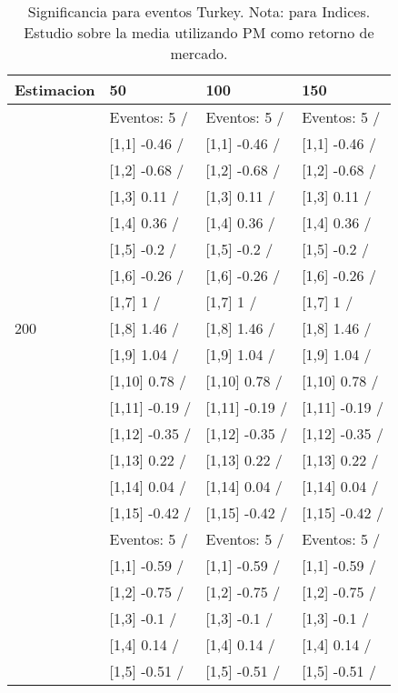 \begin{table}

\caption{Significancia para eventos Turkey. Nota: para Indices. Estudio sobre la media utilizando PM como retorno de mercado.}
\centering
\begin{tabular}[t]{llll}
\toprule
Estimacion & 50 & 100 & 150\\
\midrule
 & Eventos:  5 / & Eventos:  5 / & Eventos:  5 /\\
 & {}[1,1] -0.46  / & {}[1,1] -0.46  / & {}[1,1] -0.46  /\\
 & {}[1,2] -0.68  / & {}[1,2] -0.68  / & {}[1,2] -0.68  /\\
 & {}[1,3] 0.11  / & {}[1,3] 0.11  / & {}[1,3] 0.11  /\\
 & {}[1,4] 0.36  / & {}[1,4] 0.36  / & {}[1,4] 0.36  /\\
\addlinespace
 & {}[1,5] -0.2  / & {}[1,5] -0.2  / & {}[1,5] -0.2  /\\
 & {}[1,6] -0.26  / & {}[1,6] -0.26  / & {}[1,6] -0.26  /\\
 & {}[1,7] 1  / & {}[1,7] 1  / & {}[1,7] 1  /\\
200 & {}[1,8] 1.46  / & {}[1,8] 1.46  / & {}[1,8] 1.46  /\\
 & {}[1,9] 1.04  / & {}[1,9] 1.04  / & {}[1,9] 1.04  /\\
\addlinespace
 & {}[1,10] 0.78  / & {}[1,10] 0.78  / & {}[1,10] 0.78  /\\
 & {}[1,11] -0.19  / & {}[1,11] -0.19  / & {}[1,11] -0.19  /\\
 & {}[1,12] -0.35  / & {}[1,12] -0.35  / & {}[1,12] -0.35  /\\
 & {}[1,13] 0.22  / & {}[1,13] 0.22  / & {}[1,13] 0.22  /\\
 & {}[1,14] 0.04  / & {}[1,14] 0.04  / & {}[1,14] 0.04  /\\
\addlinespace
 & {}[1,15] -0.42  / & {}[1,15] -0.42  / & {}[1,15] -0.42  /\\
 & Eventos:  5 / & Eventos:  5 / & Eventos:  5 /\\
 & {}[1,1] -0.59  / & {}[1,1] -0.59  / & {}[1,1] -0.59  /\\
 & {}[1,2] -0.75  / & {}[1,2] -0.75  / & {}[1,2] -0.75  /\\
 & {}[1,3] -0.1  / & {}[1,3] -0.1  / & {}[1,3] -0.1  /\\
\addlinespace
 & {}[1,4] 0.14  / & {}[1,4] 0.14  / & {}[1,4] 0.14  /\\
 & {}[1,5] -0.51  / & {}[1,5] -0.51  / & {}[1,5] -0.51  /\\

\end{tabular}
\end{table}
